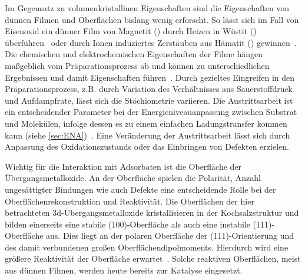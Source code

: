         Im Gegensatz zu volumenkristallinen Eigenschaften sind die Eigenschaften von dünnen Filmen und Oberflächen bislang wenig erforscht.
        So lässt sich im Fall von Eisenoxid ein dünner Film von Magnetit () durch Heizen in Wüstit () überführen~\cite{FeO_1} oder durch Ionen induziertes Zerstäuben aus Hämatit () gewinnen~\cite{FeO_36}.
        Die chemischen und elektrochemischen Eigenschaften der Filme hängen maßgeblich vom Präparationsprozess ab und können zu unterschiedlichen Ergebnissen und damit Eigenschaften führen~\cite{Uni-Tübingen}.
        Durch gezieltes Eingreifen in den Präparationsprozess, z.B. durch Variation des Verhältnisses aus Sauerstoffdruck und Aufdampfrate, lässt sich die Stöchiometrie variieren.
        Die Austrittsarbeit ist ein entscheidender Parameter bei der Energieniveauanpassung zwischen Substrat und Molekülen, infolge dessen es zu einem einfachen Ladungstransfer kommen kann (siehe \autoref{sec:ENA})~\cite{IF_3}.
        Eine Veränderung der Austrittsarbeit lässt sich durch Anpassung des Oxidationszustands oder das Einbringen von Defekten erzielen.

        Wichtig für die Interaktion mit Adsorbaten ist die Oberfläche der Übergangsmetalloxide.
        An der Oberfläche spielen die Polarität, Anzahl ungesättigter Bindungen wie auch Defekte eine entscheidende Rolle bei der Oberflächenrekonstruktion und Reaktivität.
        Die Oberflächen der hier betrachteten 3d-Übergangsmetalloxide kristallisieren in der Kochsalzstruktur und bilden einerseits eine stabile (100)-Oberfläche als auch eine instabile (111)-Oberfläche aus.
        Dies liegt an der polaren Oberfläche der (111)-Orientierung und des damit verbundenen großen Oberflächendipolmoments.
        Hierdurch wird eine größere Reaktivität der Oberfläche erwartet~\cite{cappus_hydroxyl_1993}.
        Solche reaktiven Oberflächen, meist aus dünnen Filmen, werden heute bereits zur Katalyse eingesetzt.
    
